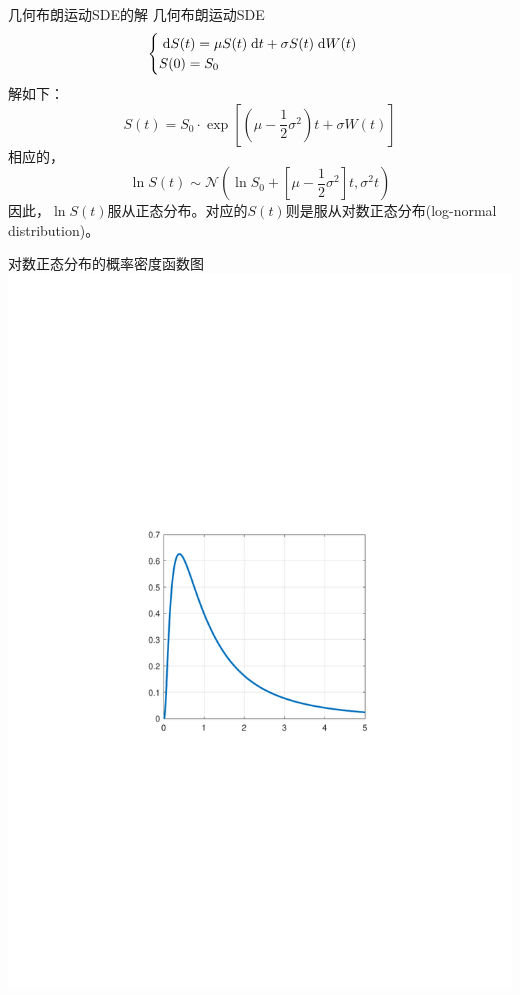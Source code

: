 \documentclass[t]{beamer}
\newcommand{\dif}{{\;\rm d}}
\begin{document}
\begin{frame}{几何布朗运动SDE的解}
几何布朗运动SDE
\[\begin{cases}
\dif S(t)=\mu S(t)\dif t+\sigma S(t) \dif W(t)\\
S(0)=S_0
\end{cases}\]
解如下：
\begin{equation*}
S(t)=S_0\cdot \exp\left[\left(\mu-\frac{1}{2}\sigma^2 \right)t+ \sigma W(t)\right]
\end{equation*}
相应的，
\[\ln S(t)\sim \mathcal{N}\left(\ln S_0+\left[\mu-\frac{1}{2}\sigma^2 \right]t, \sigma^2 t\right)  \]
因此，$\ln S(t)$服从正态分布。对应的$S(t)$则是服从对数正态分布(log-normal distribution)。
\end{frame}

\begin{frame}{对数正态分布的概率密度函数图}
	\centering
\includegraphics[scale=.8]{fig/lognormal.pdf}
\end{frame}
\end{document}
